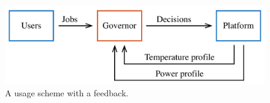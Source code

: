 \begin{figure}
  \centering
  \includegraphics[width=1.0\columnwidth]{include/assets/figures/usage.pdf}
  \caption{A usage scheme with a feedback.}
\end{figure}
